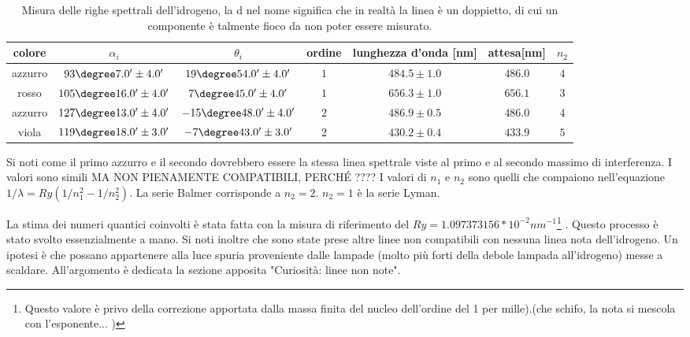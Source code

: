 \documentclass[a4paper,10pt]{article}
\begin{document}
{{{{{{{\begin{table}[H]
	\centering
	\begin{tabular}{c|c|c|c|c|c|c}
		colore & $\alpha_i$ &	$\theta_i$ & ordine & lunghezza d'onda [nm] & attesa[nm]& $n_2$  \\
		\hline
azzurro &  $ 93\degree 7.0' \pm 4.0 ' $  &  $ 19\degree 54.0' \pm 4.0 ' $  &  $ 1 $ & $ 484.5 \pm 1.0 $ & $ 486.0 $ & $ 4 $ \\
rosso &  $ 105\degree 16.0' \pm 4.0 ' $  &  $ 7\degree 45.0' \pm 4.0 ' $  &  $ 1 $ & $ 656.3 \pm 1.0 $ & $ 656.1 $ & $ 3 $ \\
azzurro &  $ 127\degree 13.0' \pm 4.0 ' $  &  $ -15\degree 48.0' \pm 4.0 ' $  &  $ 2 $ & $ 486.9 \pm 0.5 $ & $ 486.0 $ & $ 4 $ \\
viola &  $ 119\degree 18.0' \pm 3.0 ' $  &  $ -7\degree 43.0' \pm 3.0 ' $  &  $ 2 $ & $ 430.2 \pm 0.4 $ & $ 433.9 $ & $ 5 $ \\
	\end{tabular}
	\caption{Misura delle righe spettrali dell'idrogeno, la d nel nome significa che in realtà la linea è un doppietto, di cui un componente è talmente fioco da non poter essere misurato. }
	\label{tab:HH}
\end{table}



Si noti come il primo azzurro e il secondo dovrebbero essere la stessa linea spettrale viste al primo e al secondo massimo di interferenza. I valori sono simili MA NON PIENAMENTE COMPATIBILI, PERCH\'E ????
I valori di $n_1$ e $n_2$ sono quelli che compaiono nell'equazione $1/\lambda=Ry(1/n_1^2-1/n_2^2)$. La serie Balmer corrisponde a $n_2=2$. $n_2=1$ è la serie Lyman.	


La stima dei numeri quantici coinvolti è stata fatta con la misura di riferimento del $Ry=1.097373156 * 10^{-2} nm^{-1}$\footnote{ Questo valore è privo della correzione apportata dalla massa finita del nucleo dell'ordine del 1 per mille).(che schifo, la nota si mescola con l'esponente... )} . Questo processo è stato svolto essenzialmente a mano.
Si noti inoltre che sono state prese altre linee non compatibili con nessuna linea nota dell'idrogeno. Un ipotesi è che possano appartenere alla luce spuria proveniente dalle lampade (molto più forti della debole lampada all'idrogeno) messe a scaldare. All'argomento è dedicata la sezione apposita "Curiosità: linee non note".


}}}}}}}
\end{document}
